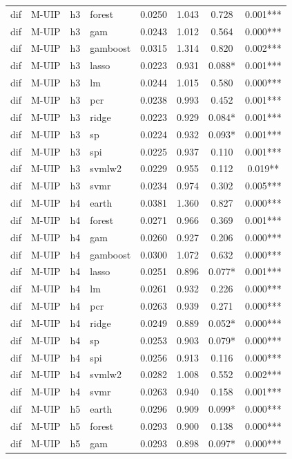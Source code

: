 \begin{ThreePartTable}
\begin{longtable}[t]{llclcccc}
dif & M-UIP & h3 & forest & 0.0250 & 1.043 & 0.728 & 0.001***\\
dif & M-UIP & h3 & gam & 0.0243 & 1.012 & 0.564 & 0.000***\\
dif & M-UIP & h3 & gamboost & 0.0315 & 1.314 & 0.820 & 0.002***\\
dif & M-UIP & h3 & lasso & 0.0223 & 0.931 & 0.088* & 0.001***\\
dif & M-UIP & h3 & lm & 0.0244 & 1.015 & 0.580 & 0.000***\\
dif & M-UIP & h3 & pcr & 0.0238 & 0.993 & 0.452 & 0.001***\\
dif & M-UIP & h3 & ridge & 0.0223 & 0.929 & 0.084* & 0.001***\\
dif & M-UIP & h3 & sp & 0.0224 & 0.932 & 0.093* & 0.001***\\
dif & M-UIP & h3 & spi & 0.0225 & 0.937 & 0.110 & 0.001***\\
dif & M-UIP & h3 & svmlw2 & 0.0229 & 0.955 & 0.112 & 0.019**\\
dif & M-UIP & h3 & svmr & 0.0234 & 0.974 & 0.302 & 0.005***\\
\addlinespace
dif & M-UIP & h4 & earth & 0.0381 & 1.360 & 0.827 & 0.000***\\
dif & M-UIP & h4 & forest & 0.0271 & 0.966 & 0.369 & 0.001***\\
dif & M-UIP & h4 & gam & 0.0260 & 0.927 & 0.206 & 0.000***\\
dif & M-UIP & h4 & gamboost & 0.0300 & 1.072 & 0.632 & 0.000***\\
dif & M-UIP & h4 & lasso & 0.0251 & 0.896 & 0.077* & 0.001***\\
dif & M-UIP & h4 & lm & 0.0261 & 0.932 & 0.226 & 0.000***\\
dif & M-UIP & h4 & pcr & 0.0263 & 0.939 & 0.271 & 0.000***\\
dif & M-UIP & h4 & ridge & 0.0249 & 0.889 & 0.052* & 0.000***\\
dif & M-UIP & h4 & sp & 0.0253 & 0.903 & 0.079* & 0.000***\\
dif & M-UIP & h4 & spi & 0.0256 & 0.913 & 0.116 & 0.000***\\
dif & M-UIP & h4 & svmlw2 & 0.0282 & 1.008 & 0.552 & 0.002***\\
dif & M-UIP & h4 & svmr & 0.0263 & 0.940 & 0.158 & 0.001***\\
\addlinespace
dif & M-UIP & h5 & earth & 0.0296 & 0.909 & 0.099* & 0.000***\\
dif & M-UIP & h5 & forest & 0.0293 & 0.900 & 0.138 & 0.000***\\
dif & M-UIP & h5 & gam & 0.0293 & 0.898 & 0.097* & 0.000***\\

\end{longtable}
\end{ThreePartTable}

